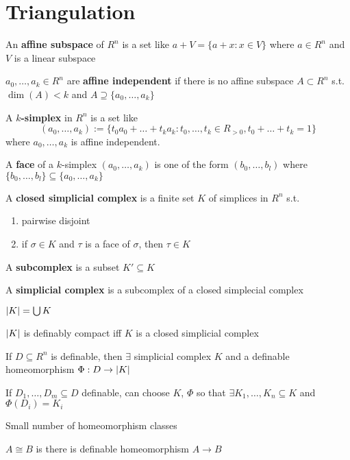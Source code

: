 \documentclass[11pt]{article}
\begin{document}
\section{Triangulation}
\label{sec:org3bbc592}
An \textbf{affine subspace} of \(R^n\) is a set like \(a+V=\{a+x:x\in V\}\) where \(a\in R^n\) and \(V\) is a
linear subspace

\(a_0,\dots,a_k\in R^n\) are \textbf{affine independent} if there is no affine subspace \(A\subset R^n\)
s.t. \(\dim(A)<k\) and \(A\supseteq\{a_0,\dots,a_k\}\)

\begin{definition}[]
A \textbf{\(k\)-simplex} in \(R^n\) is a set like
\begin{equation*}
(a_0,\dots,a_k):=\{t_0a_0+\dots+t_ka_k:t_0,\dots,t_k\in R_{>0}, t_0+\dots+t_k=1\}
\end{equation*}
where \(a_0,\dots,a_k\) is affine independent.

A \textbf{face} of a \(k\)-simplex \((a_0,\dots,a_k)\) is one of the form \((b_0,\dots,b_l)\)
where \(\{b_0,\dots,b_l\}\subseteq\{a_0,\dots,a_k\}\)

A \textbf{closed simplicial complex} is a finite set \(K\) of simplices in \(R^n\) s.t.
\begin{enumerate}
\item pairwise disjoint
\item if \(\sigma\in K\) and \(\tau\) is a face of \(\sigma\), then \(\tau\in K\)
\end{enumerate}

A \textbf{subcomplex} is a subset \(K'\subseteq K\)

A \textbf{simplicial complex} is a subcomplex of a closed simplecial complex
\end{definition}

\(\abs{K}=\bigcup K\)

\(\abs{K}\) is definably compact iff \(K\) is a closed simplicial complex

\begin{theorem}
If \(D\subseteq R^n\) is definable, then \(\exists\) simplicial complex \(K\) and a definable
homeomorphism \(\Phi:D\to\abs{K}\)

If \(D_1,\dots,D_m\subseteq D\) definable, can choose \(K\), \(\Phi\) so that \(\exists K_1,\dots,K_n\subseteq K\) and \(\Phi(D_i)=K_i\)
\end{theorem}

Small number of homeomorphism classes

\(A\cong B\) is there is definable homeomorphism \(A\to B\)
\end{document}

